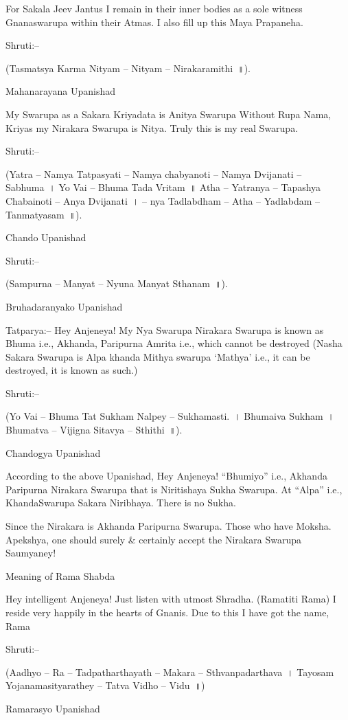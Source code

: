 For Sakala Jeev Jantus I remain in their inner bodies as a sole witness Gnanaswarupa within their Atmas. I also fill up this Maya Prapaneha.

Shruti:–

(Tasmatsya Karma Nityam – Nityam – Nirakaramithi~॥).

Mahanarayana Upanishad

My Swarupa as a Sakara Kriyadata is Anitya Swarupa Without Rupa Nama, Kriyas my Nirakara Swarupa is Nitya. Truly this is my real Swarupa.

Shruti:–

(Yatra – Namya Tatpasyati – Namya chabyanoti – Namya Dvijanati – Sabhuma~। Yo Vai – Bhuma Tada Vritam~॥ Atha – Yatranya – Tapashya Chabainoti – Anya Dvijanati~। – nya Tadlabdham – Atha – Yadlabdam – Tanmatyasam~॥).

Chando Upanishad

Shruti:–

(Sampurna – Manyat – Nyuna Manyat Sthanam~॥).

Bruhadaranyako Upanishad

Tatparya:– Hey Anjeneya! My Nya Swarupa Nirakara Swarupa is known as Bhuma i.e., Akhanda, Paripurna Amrita i.e., which cannot be destroyed (Nasha Sakara Swarupa is Alpa khanda Mithya swarupa ‘Mathya’ i.e., it can be destroyed, it is known as such.)

Shruti:–

(Yo Vai – Bhuma Tat Sukham Nalpey – Sukhamasti.~। Bhumaiva Sukham~। Bhumatva – Vijigna Sitavya – Sthithi~॥).

Chandogya Upanishad

According to the above Upanishad, Hey Anjeneya! “Bhumiyo” i.e., Akhanda Paripurna Nirakara Swarupa that is Niritishaya Sukha Swarupa. At “Alpa” i.e., KhandaSwarupa Sakara Niribhaya. There is no Sukha.

Since the Nirakara is Akhanda Paripurna Swarupa. Those who have Moksha. Apekshya, one should surely \& certainly accept the Nirakara Swarupa Saumyaney!

Meaning of Rama Shabda

Hey intelligent Anjeneya! Just listen with utmost Shradha. (Ramatiti Rama) I reside very happily in the hearts of Gnanis. Due to this I have got the name, Rama

Shruti:–

(Aadhyo – Ra – Tadpatharthayath – Makara – Sthvanpadarthava~। Tayosam Yojanamasityarathey – Tatva Vidho – Vidu~॥)

Ramarasyo Upanishad

